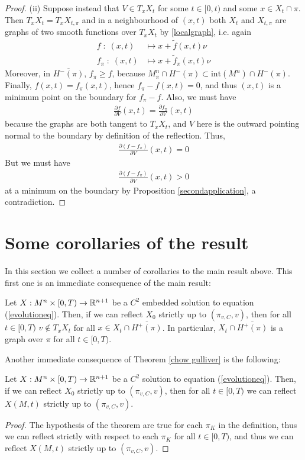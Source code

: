 \begin{proof}
	(ii) Suppose instead that $V\in T_xX_t$  for some $t\in [0, t)$ and some $x\in X_t\cap \pi$. Then $T_xX_t= T_xX_{t, \pi}$ and in a neighbourhood of $(x, t)$ both $X_t$ and $X_{t, \pi}$ are graphs of two smooth functions over $T_xX_t$ by \ref{localgraph}, i.e. again
	\begin{align*}
		f \; : \; (x, t) &\mapsto x+\tilde{f}(x, t)\nu \\
		f_\pi \; : \; (x, t) &\mapsto x+\tilde{f}_\pi(x, t)\nu 
	\end{align*} 
	Moreover, in $\overline{H^-(\pi)}$, $f_\pi\geq f$, because $M^n_\pi\cap H^-(\pi)\subset \mathrm{int}(M^n)\cap H^-(\pi)$. Finally, $f(x, t)=f_\pi (x, t)$, hence $f_\pi-f (x, t)=0$, and thus  $(x, t)$ is a minimum point on the boundary for $f_\pi-f$. Also, we must have
	\begin{align*}
		\frac{\partial f}{\partial V}(x,t)=\frac{\partial f_\pi}{\partial V}(x,t)
	\end{align*}
	because the graphs are both tangent to $T_xX_t$, and $V$ here is the outward pointing normal to the boundary by definition of the reflection. Thus, 
	\begin{align*}
		\frac{\partial (f- f_\pi)}{\partial V}(x,t)=0
	\end{align*}
	But we must have 
	\begin{align*}
		\frac{\partial (f- f_\pi)}{\partial V}(x,t)>0
	\end{align*}
	at a minimum on the boundary by Proposition \ref{secondapplication}, a contradiction.  
\end{proof}


\section{Some corollaries of the result} 
In this section we collect a number of corollaries to the main result above. This first one is an immediate consequence of the main result:
\begin{cor}
	Let $X:M^n\times [0,T) \rightarrow \mathbb{R}^{n+1}$ be a $C^2$ embedded solution to equation (\ref{evolutioneq}). Then, if we can reflect $X_0$ strictly up to $(\pi_{v,C},v)$, then for all $t\in [0,T)$ $v\notin T_xX_t$ for all $x\in X_t\cap\overline{H^+(\pi)}$. In particular,  $ X_t\cap\overline{H^+(\pi)}$ is a graph over $\pi$ for all $t\in [0,T)$.
\end{cor}




Another immediate consequence of Theorem \ref{chow gulliver} is the following:
\begin{cor}
	Let $X:M^n\times [0,T) \rightarrow \mathbb{R}^{n+1}$ be a $C^2$ solution to equation (\ref{evolutioneq}). Then, if we can reflect $X_0$ strictly up to $(\pi_{v,C},v)$, then for all $t\in [0,T)$ we can reflect $X(M, t)$ strictly up to $(\pi_{v,C},v)$.  
\end{cor}
\begin{proof}
	The hypothesis of the theorem are true for each $\pi_K$ in the definition, thus we can reflect strictly with respect to each $\pi_K$ for all $t\in[0,T)$, and thus we can reflect $X(M, t)$ strictly up to $(\pi_{v,C},v)$.
\end{proof}

